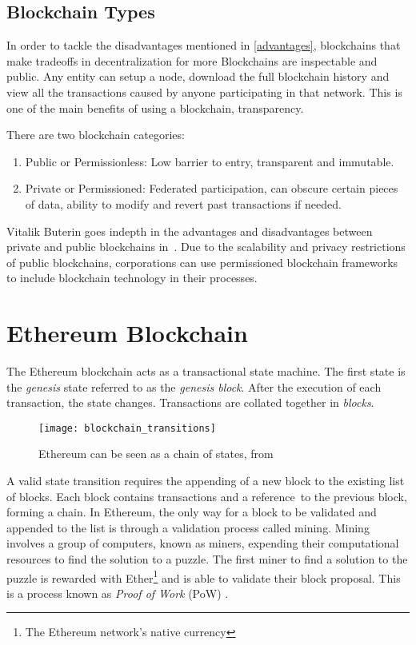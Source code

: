 \subsection{Blockchain Types}
In order to tackle the disadvantages mentioned in \ref{advantages}, blockchains that make tradeoffs in decentralization for more 
Blockchains are inspectable and public. Any entity can setup a node, download the full blockchain history and view all the transactions caused by anyone participating in that network. This is one of the main benefits of using a blockchain, transparency.

There are two blockchain categories:
\begin{enumerate}
    \item Public or Permissionless: Low barrier to entry, transparent and immutable.
    \item Private or Permissioned: Federated participation, can obscure certain pieces of data, ability to modify and revert past transactions if needed.
\end{enumerate}

Vitalik Buterin goes indepth in the advantages and disadvantages between private and public blockchains in~\cite{publicprivate}. Due to the scalability and privacy restrictions of public blockchains, corporations can use permissioned blockchain frameworks~\cite{quorum, hyperledger, r3} to include blockchain technology in their processes.

\section{Ethereum Blockchain}
The Ethereum blockchain acts as a transactional state machine. The first state is the \textit{genesis} state referred to as the \textit{genesis block}. After the execution of each transaction, the state changes. Transactions are collated together in \textit{blocks}. 

\begin{figure}[H]
    \centering
    \texttt{[image: blockchain\_transitions]}
    \caption{Ethereum can be seen as a chain of states, from~\cite{visual}}
    \label{fig:worldstate_update}
\end{figure}

A valid state transition requires the appending of a new block to the existing list of blocks. Each block contains transactions and a reference~to the previous block, forming a chain. In Ethereum, the only way for a block to be validated and appended to the list is through a validation process called mining. Mining involves a group of computers, known as miners, expending their computational resources to find the solution to a puzzle. The first miner to find a solution to the puzzle is rewarded with Ether\footnote{The Ethereum network's native currency} and is able to validate their block proposal. This is a process known as \textit{Proof of Work} (PoW) \cite{pow}. 

